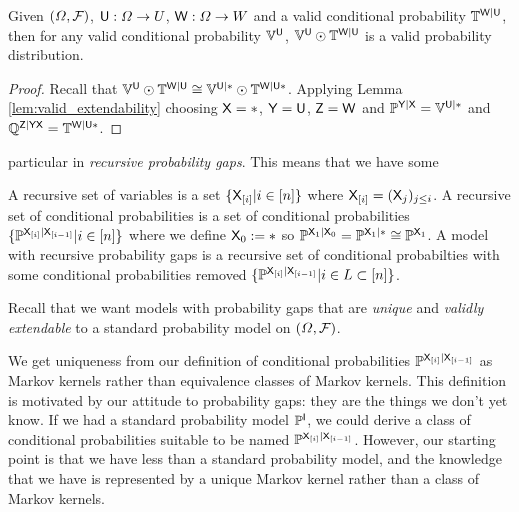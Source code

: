 \begin{corollary}
Given $(\Omega,\mathcal{F})$, $\mathsf{U}:\Omega\to U$, $\mathsf{W}:\Omega\to W$ and a valid conditional probability $\mathbb{T}^{\mathsf{W}|\mathsf{U}}$, then for any valid conditional probability $\mathbb{V}^{\mathsf{U}}$, $\mathbb{V}^{\mathsf{U}}\odot \mathbb{T}^{\mathsf{W}|\mathsf{U}}$ is a valid probability distribution.
\end{corollary}

\begin{proof}
Recall that $\mathbb{V}^{\mathsf{U}}\odot \mathbb{T}^{\mathsf{W}|\mathsf{U}}\cong \mathbb{V}^{\mathsf{U}|*}\odot \mathbb{T}^{\mathsf{W}|\mathsf{U}*}$. Applying Lemma \ref{lem:valid_extendability} choosing $\mathsf{X}=*$, $\mathsf{Y}=\mathsf{U}$, $\mathsf{Z}=\mathsf{W}$ and $\mathbb{P}^{\mathsf{Y}|\mathsf{X}}=\mathbb{V}^{\mathsf{U}|*}$ and $\mathbb{Q}^{\mathsf{Z}|\mathsf{YX}}=\mathbb{T}^{\mathsf{W}|\mathsf{U*}}$.
\end{proof}

particular in \emph{recursive probability gaps}. This means that we have some 

 A recursive set of variables is a set $\{\mathsf{X}_{[i]}|i\in [n]\}$ where $\mathsf{X}_{[i]}=(\mathsf{X}_j)_{j\leq i}$. A recursive set of conditional probabilities is a set of conditional probabilities $\{\mathbb{P}^{\mathsf{X}_{[i]}|\mathsf{X}_{[i-1]}}|i\in [n]\}$ where we define $\mathsf{X}_0:=*$ so $\mathbb{P}^{\mathsf{X}_1|\mathsf{X}_0}=\mathbb{P}^{\mathsf{X}_1|*}\cong \mathbb{P}^{\mathsf{X}_1}$. A model with recursive probability gaps is a recursive set of conditional probabilties with some conditional probabilities removed $\{\mathbb{P}^{\mathsf{X}_{[i]}|\mathsf{X}_{[i-1]}}|i\in L\subset [n]\}$.

Recall that we want models with probability gaps that are \emph{unique} and \emph{validly extendable} to a standard probability model on $(\Omega,\mathcal{F})$. 

We get uniqueness from our definition of conditional probabilities $\mathbb{P}^{\mathsf{X}_{[i]}|\mathsf{X}_{[i-1]}}$ as Markov kernels rather than equivalence classes of Markov kernels. This definition is motivated by our attitude to probability gaps: they are the things we don't yet know. If we had a standard probability model $\mathbb{P}^{\mathsf{I}}$, we could derive a class of conditional probabilities suitable to be named $\mathbb{P}^{\mathsf{X}_{[i]}|\mathsf{X}_{[i-1]}}$. However, our starting point is that we have less than a standard probability model, and the knowledge that we have is represented by a unique Markov kernel rather than a class of Markov kernels.


